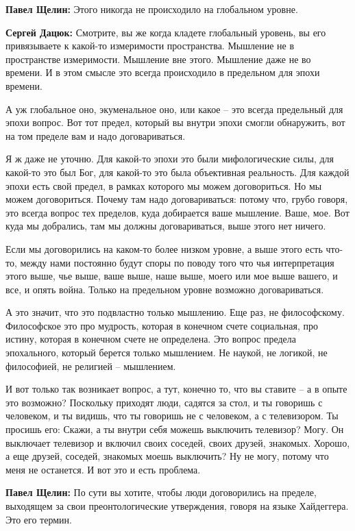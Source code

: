 \textbf{Павел Щелин:} Этого никогда не происходило на глобальном уровне.

\textbf{Сергей Дацюк:} Смотрите, вы же когда кладете глобальный уровень, вы его
привязываете к какой-то измеримости пространства. Мышление не в пространстве
измеримости. Мышление вне этого. Мышление даже не во времени. И в этом смысле
это всегда происходило в предельном для эпохи времени.

А уж глобальное оно, экуменальное оно, или какое – это всегда предельный для
эпохи вопрос. Вот тот предел, который вы внутри эпохи смогли обнаружить, вот на
том пределе вам и надо договариваться.

Я ж даже не уточню. Для какой-то эпохи это были мифологические силы, для
какой-то это был Бог, для какой-то это была объективная реальность. Для каждой
эпохи есть свой предел, в рамках которого мы можем договориться. Но мы можем
договориться. Почему там надо договариваться: потому что, грубо говоря, это
всегда вопрос тех пределов, куда добирается ваше мышление. Ваше, мое. Вот куда
мы добрались, там мы должны договариваться, выше этого нет ничего.

Если мы договорились на каком-то более низком уровне, а выше этого есть что-то,
между нами постоянно будут споры по поводу того что чья интерпретация этого
выше, чье выше, ваше выше, наше выше, моего или мое выше вашего, и все, и опять
война. Только на предельном уровне возможно договариваться.

А это значит, что это подвластно только мышлению. Еще раз, не философскому.
Философское это про мудрость, которая в конечном счете социальная, про истину,
которая в конечном счете не определена. Это вопрос предела эпохального, который
берется только мышлением. Не наукой, не логикой, не философией, не религией –
мышлением.

И вот только так возникает вопрос, а тут, конечно то, что вы ставите – а в
опыте это возможно? Поскольку приходят люди, садятся за стол, и ты говоришь с
человеком, и ты видишь, что ты говоришь не с человеком, а с телевизором. Ты
просишь его: Скажи, а ты внутри себя можешь выключить телевизор? Могу. Он
выключает телевизор и включил своих соседей, своих друзей, знакомых. Хорошо, а
еще друзей, соседей, знакомых моешь выключить? Ну не могу, потому что меня не
останется. И вот это и есть проблема.

\textbf{Павел Щелин:} По сути вы хотите, чтобы люди договорились на пределе, выходящем
за свои преонтологические утверждения, говоря на языке Хайдеггера. Это его
термин.

